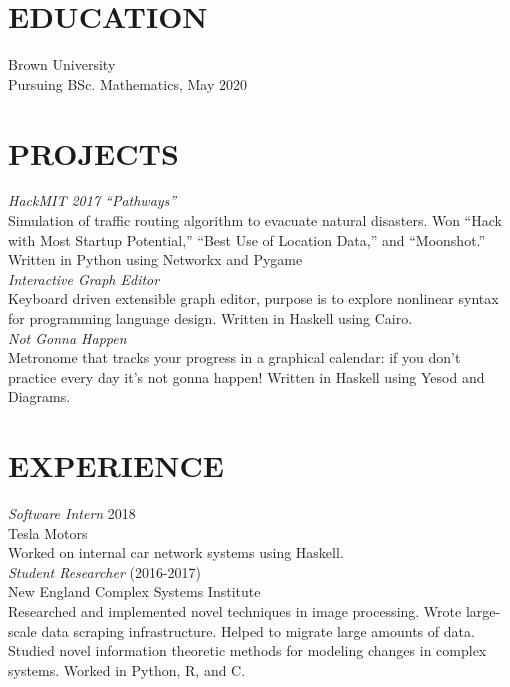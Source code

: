 \documentclass[line,margin]{res}
\begin{document}
\address{(617) 279-3222, root@owenlynch.org}

 
\begin{resume}
 
\section{EDUCATION} Brown University \\
                Pursuing BSc. Mathematics, May 2020 \\
 
\section{PROJECTS} {\sl HackMIT 2017 ``Pathways''} \\
                Simulation of traffic routing algorithm to evacuate natural disasters. Won ``Hack with Most Startup Potential,'' ``Best Use of Location Data,'' and ``Moonshot.'' Written in Python using Networkx and Pygame \\
                {\sl Interactive Graph Editor} \\
                   Keyboard driven extensible graph editor, purpose is to explore nonlinear syntax for programming language design. Written in Haskell using Cairo. \\
                {\sl Not Gonna Happen} \\
                Metronome that tracks your progress in a graphical calendar: if you don't practice every day it's not gonna happen! Written in Haskell using Yesod and Diagrams.
 
\section{EXPERIENCE}
                {\sl Software Intern} \hfill 2018 \\
                Tesla Motors \\
                Worked on internal car network systems using Haskell. \\
                {\sl Student Researcher} \hfill (2016-2017) \\
                New England Complex Systems Institute \\
                Researched and implemented novel techniques in image processing. Wrote large-scale data scraping infrastructure. Helped to migrate large amounts of data. Studied novel information theoretic methods for modeling changes in complex systems. Worked in Python, R, and C. \\
 

\end{resume}
\end{document}
